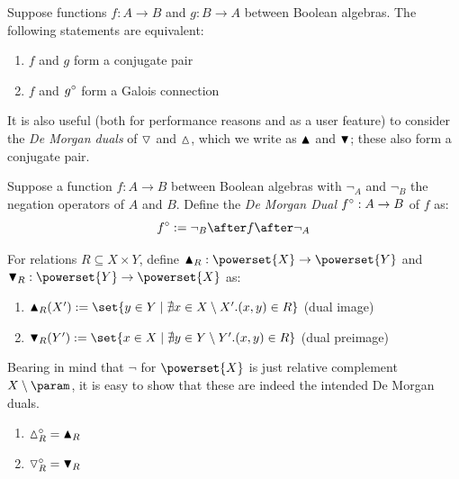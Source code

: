 \begin{proposition}%
   \label{prop:conj-galois-correspond}
   Suppose functions $f: A \to B$ and $g: B \to A$ between Boolean algebras. The following statements are
   equivalent:
   \begin{enumerate}
      \item $f$ and $g$ form a conjugate pair
      \item $f$ and $g^{\circ}$ form a Galois connection
   \end{enumerate}
\end{proposition}
%
It is also useful (both for performance reasons and as a user feature) to consider the \emph{De Morgan duals}
of $\triangledown$ and $\demandedByR$, which we write as $\blacktriangle$ and $\blacktriangledown$; these also form a
conjugate pair.

\begin{definition}
   \label{def:conjugate:de-morgan-dual}
   Suppose a function $f: A \to B$ between Boolean algebras with $\neg_A$ and $\neg_B$ the negation operators
   of $A$ and $B$. Define the \textit{De Morgan Dual} $f^{\circ}: A \to B$ of $f$ as:
   \[ \dual{f} \eqdef \neg_B \after f \after \neg_A \]
\end{definition}

\begin{definition}
   For relations $R \subseteq X \times Y$, define $\sufficesR_R: \powerset{X} \to \powerset{Y}$ and
   $\preimageDualR_R: \powerset{Y} \to \powerset{X}$ as:
   \begin{enumerate}
      \item $\sufficesR_R(X') \eqdef \set{y \in Y \mid \nexists x \in X \setminus X'.(x, y) \in R}$ \hfill
      (dual image)
      \item $\preimageDualR_R(Y') \eqdef \set{x \in X \mid \nexists y \in Y \setminus Y'.(x, y) \in R}$ \hfill
      (dual preimage)
   \end{enumerate}
\end{definition}
%
Bearing in mind that $\neg$ for $\powerset{X}$ is just relative complement $X \setminus \param$, it is easy to
show that these are indeed the intended De Morgan duals.

\begin{lemma}
   \label{lem:conjugate:image-preimage-duality}
   \item
   \begin{enumerate}
      \item $\dual{\demandedByR_R} = \sufficesR_R$
      \item $\triangledown_R^{\circ} = \blacktriangledown_R$
   \end{enumerate}
\end{lemma}

